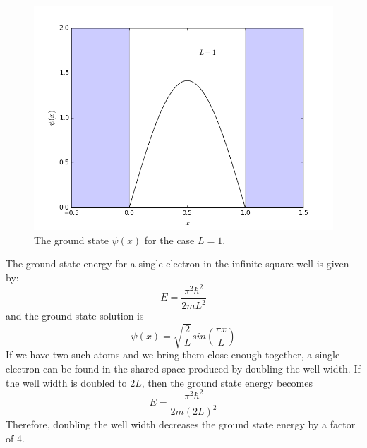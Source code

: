 \documentclass{article}
\begin{document}
\begin{figure}[h]
\centering
\includegraphics[scale=.5]{figure_1}
\caption{The ground state $\psi(x)$ for the case $L = 1$.}
\end{figure}
The ground state energy for a single electron in the infinite square well is given by: $$E = \frac{\pi^{2}\hbar^{2}}{2mL^{2}}$$
and the ground state solution is $$\psi(x) = \sqrt{\frac{2}{L}}sin\left (\frac{\pi x}{L}\right )$$ If we have two such atoms and we bring them close enough together, a single electron can be found in the shared space produced by doubling the well width. If the well width is doubled
to $2L$, then the ground state energy becomes $$E = \frac{\pi^{2}\hbar^{2}}{2m(2L)^{2}}$$ Therefore, doubling the well width decreases the ground state energy by a factor of 4.
\end{document}
